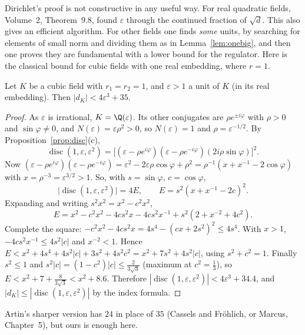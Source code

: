Dirichlet's proof is not constructive in any useful way. For real quadratic fields, Volume~2, Theorem~9.8, found $\varepsilon$ through
the continued fraction of $\sqrt d$. This also gives an efficient algorithm. For other fields one finds \emph{some} units,
by searching for elements of small norm and dividing them as in Lemma~\ref{lem:onebig}, and then one proves they are
fundamental with a lower bound for the regulator. Here is the classical bound for cubic fields with one real embedding,
where $r=1$.

\begin{proposition}\label{prop:artin}
Let $K$ be a cubic field with $r_1=r_2=1$, and $\varepsilon>1$ a unit of $K$ (in its real embedding). Then
$|d_K|<4\varepsilon^3+35$.
\end{proposition}
\begin{proof}
As $\varepsilon$ is irrational, $K=\Q(\varepsilon)$. Its other conjugates are $\rho e^{\pm i\varphi}$ with $\rho>0$ and
$\sin\varphi\ne0$, and $N(\varepsilon)=\varepsilon\rho^2>0$, so $N(\varepsilon)=1$ and $\rho=\varepsilon^{-1/2}$. By
Proposition~\ref{prop:disc}(c),
\[
\operatorname{disc}(1,\varepsilon,\varepsilon^2)=\bigl[(\varepsilon-\rho e^{i\varphi})(\varepsilon-\rho e^{-i\varphi})
(2i\rho\sin\varphi)\bigr]^2.
\]
Now $(\varepsilon-\rho e^{i\varphi})(\varepsilon-\rho e^{-i\varphi})=\varepsilon^2-2\varepsilon\rho\cos\varphi+\rho^2=
\rho^{-1}(x+x^{-1}-2\cos\varphi)$ with $x=\rho^{-3}=\varepsilon^{3/2}>1$. So, with $s=\sin\varphi$, $c=\cos\varphi$,
\[
\bigl|\operatorname{disc}(1,\varepsilon,\varepsilon^2)\bigr|=4E,\qquad E=s^2(x+x^{-1}-2c)^2.
\]
Expanding and writing $s^2x^2=x^2-c^2x^2$,
\[
E=x^2-c^2x^2-4cs^2x-4cs^2x^{-1}+s^2(2+x^{-2}+4c^2).
\]
Complete the square: $-c^2x^2-4cs^2x=4s^4-(cx+2s^2)^2\le4s^4$. With $x>1$, $-4cs^2x^{-1}\le4s^2|c|$ and $x^{-2}<1$.
Hence $E<x^2+4s^4+4s^2|c|+3s^2+4s^2c^2=x^2+7s^2+4s^2|c|$, using $s^2+c^2=1$. Finally $s^2\le1$ and $s^2|c|=(1-c^2)|c|
\le\frac2{3\sqrt3}$ (maximum at $c^2=\frac13$), so $E<x^2+7+\frac8{3\sqrt3}<x^2+8.6$. Therefore $|\operatorname{disc}(1,
\varepsilon,\varepsilon^2)|<4\varepsilon^3+34.4$, and $|d_K|\le|\operatorname{disc}(1,\varepsilon,\varepsilon^2)|$ by the index
formula.
\end{proof}

Artin's sharper version has $24$ in place of $35$ (Cassels and Fr\"ohlich, or Marcus, Chapter~5), but ours is enough here.

